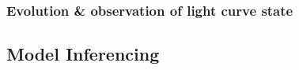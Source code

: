 \documentclass[hyperref={pdfpagelabels=false}]{beamer}
\begin{document}
\begin{frame}
\frametitle{Evolution \& observation of light curve state}
  \begin{center}
    \centering
  \end{center}
\end{frame}

\subsection{Model Inferencing}

\end{document}

